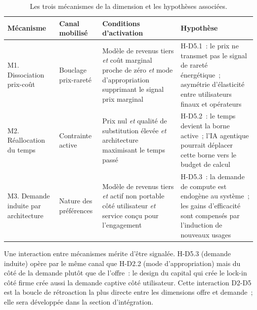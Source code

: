 \begin{table}[!ht]
\caption{Les trois mécanismes de la dimension et les hypothèses associées.}\label{tab:d5-mecanismes}
\centering\footnotesize
\renewcommand{\arraystretch}{1.25}
\begin{tabularx}{\textwidth}{@{}p{2.6cm}p{2.8cm}p{3.6cm}X@{}}
\toprule
\textbf{Mécanisme} & \textbf{Canal mobilisé} & \textbf{Conditions d'activation} & \textbf{Hypothèse} \\
\midrule
M1. Dissociation prix-coût & Bouclage prix-rareté & Modèle de revenus tiers \emph{et} coût marginal proche de zéro \emph{et} mode d'appropriation supprimant le signal prix marginal & H-D5.1~: le prix ne transmet pas le signal de rareté énergétique~; asymétrie d'élasticité entre utilisateurs finaux et opérateurs \\
M2. Réallocation du temps & Contrainte active & Prix nul \emph{et} qualité de substitution élevée \emph{et} architecture maximisant le temps passé & H-D5.2~: le temps devient la borne active~; l'IA agentique pourrait déplacer cette borne vers le budget de calcul \\
M3. Demande induite par architecture & Nature des préférences & Modèle de revenus tiers \emph{et} actif non portable côté utilisateur \emph{et} service conçu pour l'engagement & H-D5.3~: la demande de compute est endogène au système~; les gains d'efficacité sont compensés par l'induction de nouveaux usages \\
\bottomrule
\end{tabularx}
\renewcommand{\arraystretch}{1.0}
\end{table}

Une interaction entre mécanismes mérite d'être signalée. H-D5.3 (demande induite) opère par le même canal que H-D2.2 (mode d'appropriation) mais du côté de la demande plutôt que de l'offre~: le design du capital qui crée le lock-in côté firme crée aussi la demande captive côté utilisateur. Cette interaction D2-D5 est la boucle de rétroaction la plus directe entre les dimensions offre et demande~; elle sera développée dans la section d'intégration.


\clearpage

